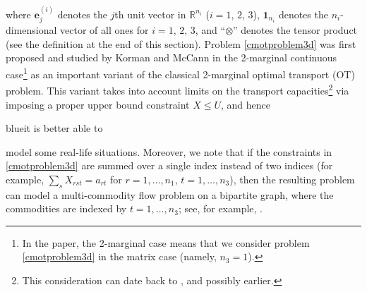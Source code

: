 \documentclass[10pt]{article}
\newcommand{\blue}[1]{\begin{color}{blue}#1\end{color}}
\newcommand{\R}{\mathbb R}
\begin{document}
where $\bm{e}_j^{(i)}$ denotes the $j$th unit vector in $\R^{n_i}$ ($i=1, \,2, \,3$), $\bm{1}_{n_i}$ denotes the $n_i$-dimensional vector of all ones for $i=1, \,2, \,3$, and ``$\otimes $'' denotes the tensor product (see the definition at the end of this section). Problem \eqref{cmotproblem3d} was first proposed and studied by Korman and McCann \cite{km2013insights,km2015optimal} in the 2-marginal continuous case\footnote{In the paper, the 2-marginal case means that we consider problem \eqref{cmotproblem3d} in the matrix case (namely, $n_3=1$).} as an important variant of the classical 2-marginal optimal transport (OT) problem. This variant takes into account limits on the transport capacities\footnote{This consideration can date back to \cite{l1984pro}, and possibly earlier.} via imposing a proper upper bound constraint $X \leq U$, and hence \blue{it is better able to} model some real-life situations. Moreover, we note that if the constraints in \eqref{cmotproblem3d} are summed over a single index instead of two indices (for example, $\sum_s X_{rst} = a_{rt}$ for $r=1,\ldots,n_1$, $t=1,\ldots,n_3$), then the resulting problem can model a multi-commodity flow problem on a bipartite graph, where the commodities are indexed by $t=1,\ldots,n_3$; see, for example, \cite{ks1977an}.
\end{document}
